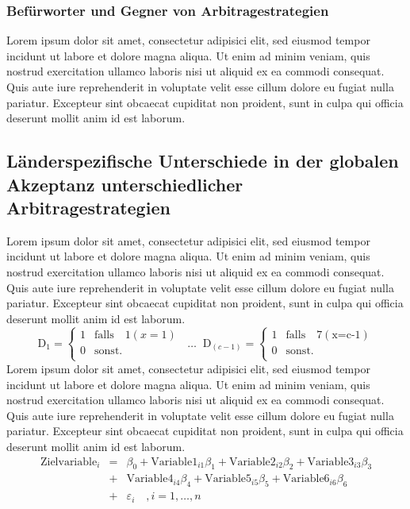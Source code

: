 \documentclass[12pt, a4paper, oneside]{article}
\begin{document}
\subsubsection{Befürworter und Gegner von Arbitragestrategien}
Lorem ipsum dolor sit amet, consectetur adipisici elit, sed eiusmod tempor incidunt ut labore et dolore magna aliqua. Ut enim ad minim veniam, quis nostrud exercitation ullamco laboris nisi ut aliquid ex ea commodi consequat. Quis aute iure reprehenderit in voluptate velit esse cillum dolore eu fugiat nulla pariatur. Excepteur sint obcaecat cupiditat non proident, sunt in culpa qui officia deserunt mollit anim id est laborum.

\subsection{Länderspezifische Unterschiede in der globalen Akzeptanz unterschiedlicher Arbitragestrategien}
Lorem ipsum dolor sit amet, consectetur adipisici elit, sed eiusmod tempor incidunt ut labore et dolore magna aliqua. Ut enim ad minim veniam, quis nostrud exercitation ullamco laboris nisi ut aliquid ex ea commodi consequat. Quis aute iure reprehenderit in voluptate velit esse cillum dolore eu fugiat nulla pariatur. Excepteur sint obcaecat cupiditat non proident, sunt in culpa qui officia deserunt mollit anim id est laborum.
%
\begin{equation*}
\text{D}_{1} = \begin{cases}
 1 & \text{falls}\quad 1(x=1)\\ 
0 & \text{sonst.}\\
\end{cases}
\;\;
\mathbf{\dotsc}
\;\;
\text{D}_{(c-1)} = \begin{cases}
 1 & \text{falls}\quad 7(\text{x=c-1})\\ 
0 & \text{sonst.}\\
\end{cases}
\end{equation*}
%
Lorem ipsum dolor sit amet, consectetur adipisici elit, sed eiusmod tempor incidunt ut labore et dolore magna aliqua. Ut enim ad minim veniam, quis nostrud exercitation ullamco laboris nisi ut aliquid ex ea commodi consequat. Quis aute iure reprehenderit in voluptate velit esse cillum dolore eu fugiat nulla pariatur. Excepteur sint obcaecat cupiditat non proident, sunt in culpa qui officia deserunt mollit anim id est laborum.
%
\begin{eqnarray}
\text{Zielvariable}_i &=&\beta_0+\text{Variable1}_{i1} \beta_{1}+\text{Variable2}_{i2} \beta_{2}+\text{Variable3}_{i3} \beta_{3}\nonumber\\
& +&\text{Variable4}_{i4} \beta_{4}+\text{Variable5}_{i5} \beta_{5}+\text{Variable6}_{i6} \beta_{6}\\
& +& \varepsilon_i \quad, i=1, \ldots, n\nonumber
\end{eqnarray} 
\end{document}
